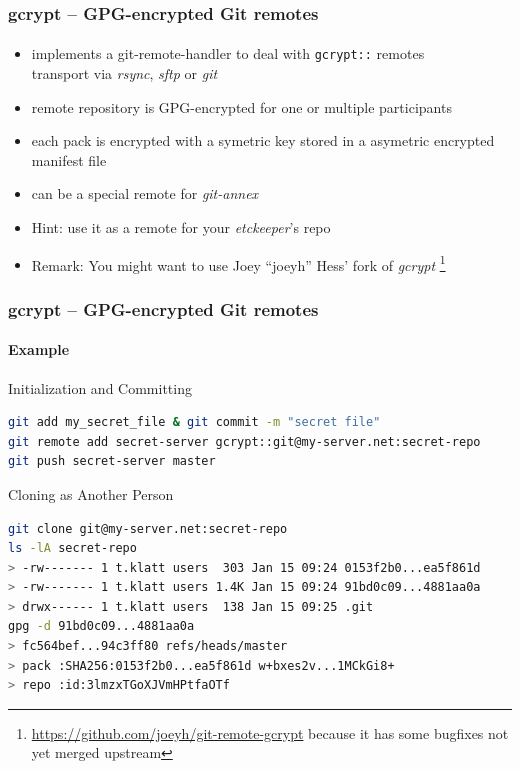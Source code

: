 \documentclass[english,hyperref={pdfpagelabels=false},aspectratio=169]{beamer}
\begin{document}
\begin{frame}[label=gcrypt]
  \frametitle{gcrypt -- GPG-encrypted Git remotes}
  \framesubtitle{}
  \begin{itemize}
    \item implements a git-remote-handler to deal with \texttt{gcrypt::} remotes\\
      {\scriptsize transport via \emph{rsync}, \emph{sftp} or \emph{git}}
    \item remote repository is GPG-encrypted for one or multiple participants
    \item each pack is encrypted with a symetric key stored in a asymetric encrypted manifest file
    \item can be a special remote for \textit{git-annex}
    \item Hint: use it as a remote for your \textit{etckeeper}'s repo
    \item \scriptsize\color{fzjgray50}Remark: You might want to use Joey ``joeyh'' Hess' fork of \emph{gcrypt}
      \footnote{\tiny\url{https://github.com/joeyh/git-remote-gcrypt} because it has some bugfixes not yet merged upstream}
  \end{itemize}
\end{frame}

\begin{frame}[fragile]
  \frametitle{gcrypt -- GPG-encrypted Git remotes}
  \framesubtitle{Example}
  \begin{block}{Initialization and Committing}
    \vspace{-0.75em}
    \begin{lstlisting}[language=zsh]
git add my_secret_file & git commit -m "secret file"
git remote add secret-server gcrypt::git@my-server.net:secret-repo
git push secret-server master
    \end{lstlisting}
    \vspace{-0.75em}
  \end{block}
  \begin{block}{Cloning as Another Person}
    \vspace{-0.75em}
    \begin{lstlisting}[language=zsh]
git clone git@my-server.net:secret-repo
ls -lA secret-repo
> -rw------- 1 t.klatt users  303 Jan 15 09:24 0153f2b0...ea5f861d
> -rw------- 1 t.klatt users 1.4K Jan 15 09:24 91bd0c09...4881aa0a
> drwx------ 1 t.klatt users  138 Jan 15 09:25 .git
gpg -d 91bd0c09...4881aa0a
> fc564bef...94c3ff80 refs/heads/master
> pack :SHA256:0153f2b0...ea5f861d w+bxes2v...1MCkGi8+
> repo :id:3lmzxTGoXJVmHPtfaOTf
    \end{lstlisting}
    \vspace{-0.75em}
  \end{block}
\end{frame}
\end{document}

